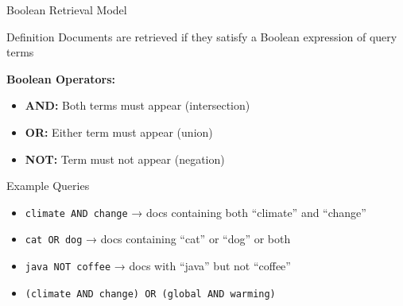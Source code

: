 \documentclass[aspectratio=169]{beamer}
\newif\ifanimated
\newcommand{\cpause}{\ifanimated\pause\fi}
\begin{document}
\begin{frame}[shrink=5]{Boolean Retrieval Model}
\begin{block}{Definition}
Documents are retrieved if they satisfy a Boolean expression of query terms
\end{block}
\cpause
\vspace{1em}

\textbf{Boolean Operators:}
\begin{itemize}
    \item \textbf{AND:} Both terms must appear (intersection)
    \item \textbf{OR:} Either term must appear (union)
    \item \textbf{NOT:} Term must not appear (negation)
\end{itemize}
\cpause
\vspace{1em}

\begin{exampleblock}{Example Queries}
\begin{itemize}
    \item \texttt{climate AND change} → docs containing both ``climate'' and ``change''
    \item \texttt{cat OR dog} → docs containing ``cat'' or ``dog'' or both
    \item \texttt{java NOT coffee} → docs with ``java'' but not ``coffee''
    \item \texttt{(climate AND change) OR (global AND warming)}
\end{itemize}
\end{exampleblock}
\end{frame}
\end{document}
